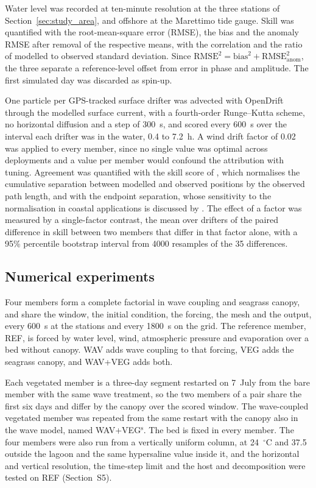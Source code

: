 Water level was recorded at ten-minute resolution at the three stations of
Section~\ref{sec:study_area}, and offshore at the Marettimo tide gauge. Skill
was quantified with the root-mean-square error (RMSE), the bias and the anomaly
RMSE after removal of the respective means, with the correlation and the ratio
of modelled to observed standard deviation. Since $\mathrm{RMSE}^2 =
\mathrm{bias}^2 + \mathrm{RMSE}_{\mathrm{anom}}^2$, the three separate a
reference-level offset from error in phase and amplitude. The first simulated
day was discarded as spin-up.

One particle per GPS-tracked surface drifter was advected with OpenDrift
\citep{Dagestad2018} through the modelled surface current, with a fourth-order
Runge--Kutta scheme, no horizontal diffusion and a step of 300~s, and scored
every 600~s over the interval each drifter was in the water, 0.4 to 7.2~h. A
wind drift factor of 0.02 was applied to every member, since no single value
was optimal across deployments and a value per member would confound the
attribution with tuning. Agreement was quantified with the skill score of
\citet{Liu2011}, which normalises the cumulative separation between modelled
and observed positions by the observed path length, and with the endpoint
separation, whose sensitivity to the normalisation in coastal applications is
discussed by \citet{Revelard2021}. The effect of a factor was measured by a
single-factor contrast, the mean over drifters of the paired difference in
skill between two members that differ in that factor alone, with a 95\%
percentile bootstrap interval from 4000 resamples of the 35 differences.

\subsection{Numerical experiments}
\label{sec:methods_experiments}

Four members form a complete factorial in wave coupling and seagrass canopy,
and share the window, the initial condition, the forcing, the mesh and the
output, every 600~s at the stations and every 1800~s on the grid. The
reference member, REF, is forced by water level, wind, atmospheric pressure
and evaporation over a bed without canopy. WAV adds wave coupling to that
forcing, VEG adds the seagrass canopy, and WAV+VEG adds both.

Each vegetated member is a three-day segment restarted on 7~July from the bare
member with the same wave treatment, so the two members of a pair share the
first six days and differ by the canopy over the scored window. The
wave-coupled vegetated member was repeated from the same restart with the
canopy also in the wave model, named WAV+VEG$^{\mathrm{s}}$. The bed is
fixed in every member. The four members were also run from a vertically
uniform column, at 24~$^\circ$C and 37.5 outside the lagoon and the same
hypersaline value inside it, and the horizontal and vertical resolution, the
time-step limit and the host and decomposition were tested on REF
(Section~S5).
